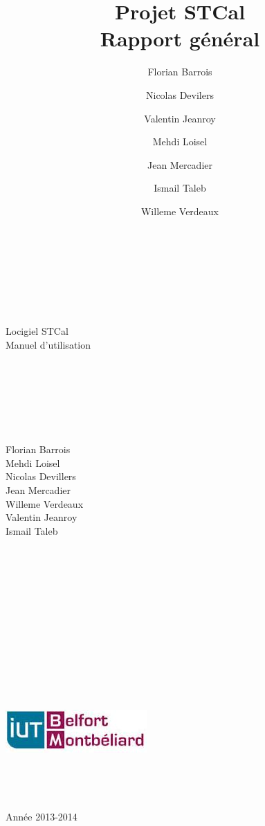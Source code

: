 \documentclass[a4paper,10pt]{book}
\date{}
\title{\Huge{Projet STCal}\\ {\Large Rapport général}}
\author{Florian Barrois \and Nicolas Devilers \and Valentin Jeanroy \and Mehdi Loisel \and Jean Mercadier \and Ismail Taleb \and Willeme Verdeaux}
\begin{document}
 \begin{titlepage}

    \begin{center}
      ~\\~\\~\\~\\~\\
      \Huge
      Locigiel STCal\\
      \LARGE
      Manuel d'utilisation\\
      ~\\~\\~\\~\\~\\~\\
      \begin{multicols}{3}
	\large
	Florian Barrois\\Mehdi Loisel\\
	\columnbreak 
	Nicolas Devillers\\Jean Mercadier\\Willeme Verdeaux\\
	\columnbreak
	Valentin Jeanroy\\Ismail Taleb
      \end{multicols}
    \end{center}


    \begin{center}
    ~\\~\\~\\~\\~\\~\\~\\~\\~\\~\\~\\~\\
    \includegraphics{../general/iutbm.jpeg}
    ~\\~\\~\\~\\~\\
    \large
    Année 2013-2014
    \end{center}

    \end{titlepage}
\end{document}
